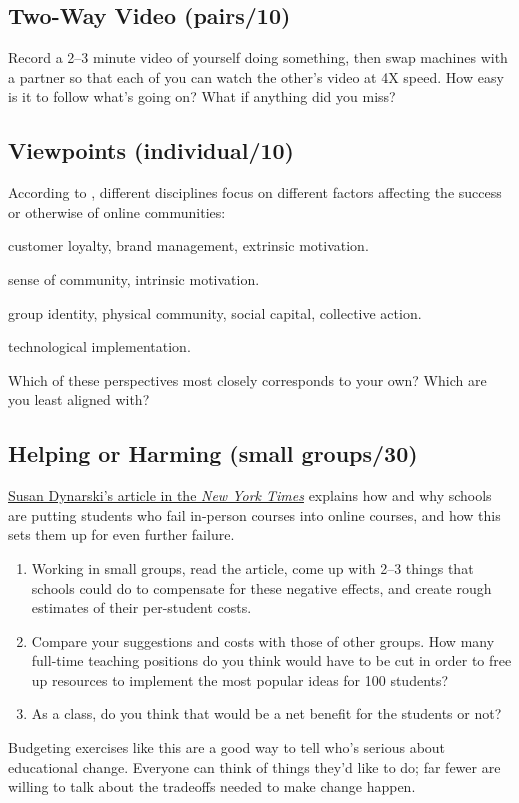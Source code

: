 \subsection{Two-Way Video (pairs/10)}\label{two-way-video-pairs10}

Record a 2--3 minute video of yourself doing something, then swap
machines with a partner so that each of you can watch the other's video
at 4X speed. How easy is it to follow what's going on? What if anything
did you miss?

\subsection{Viewpoints (individual/10)}\label{viewpoints-individual10}

According to \cite{Irib2009}, different disciplines focus on
different factors affecting the success or otherwise of online
communities:

\begin{description}
\tightlist
\item[Business:]
customer loyalty, brand management, extrinsic motivation.
\item[Psychology:]
sense of community, intrinsic motivation.
\item[Sociology:]
group identity, physical community, social capital, collective
action.
\item[Computer Science:]
technological implementation.
\end{description}

Which of these perspectives most closely corresponds to your own? Which
are you least aligned with?

\subsection{Helping or Harming (small groups/30)}\label{helping-or-harming-small-groups30}

\href{https://www.nytimes.com/2018/01/19/business/online-courses-are-harming-the-students-who-need-the-most-help.html}{Susan Dynarski's article in the \emph{New York Times}}
explains how and why schools are putting students who fail in-person courses
into online courses, and how this sets them up for even further failure.

\begin{enumerate}
\item
  Working in small groups, read the article, come up with 2--3 things
  that schools could do to compensate for these negative effects, and
  create rough estimates of their per-student costs.
\item
  Compare your suggestions and costs with those of other groups. How
  many full-time teaching positions do you think would have to be cut
  in order to free up resources to implement the most popular ideas
  for 100 students?
\item
  As a class, do you think that would be a net benefit for the
  students or not?
\end{enumerate}

Budgeting exercises like this are a good way to tell who's serious about
educational change. Everyone can think of things they'd like to do; far
fewer are willing to talk about the tradeoffs needed to make change
happen.

